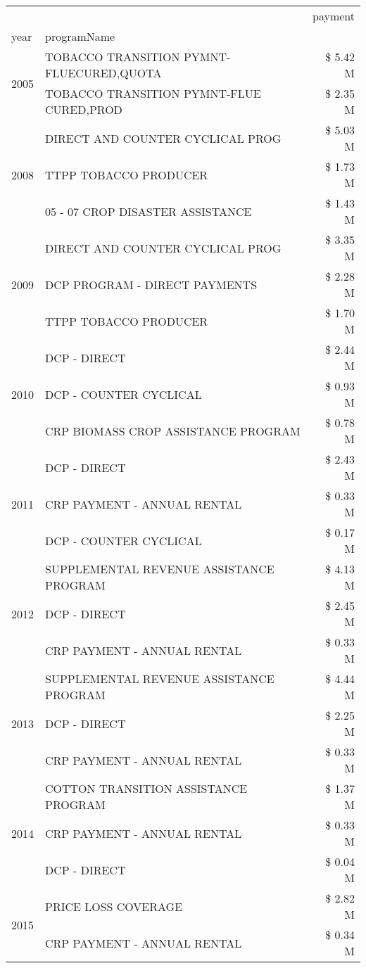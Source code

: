 \begin{tabular}{llr}
\toprule
 &  & payment \\
year & programName &  \\
\midrule
\multirow[t]{2}{*}{2005} & TOBACCO TRANSITION PYMNT-FLUECURED,QUOTA & \$ 5.42 M \\
 & TOBACCO TRANSITION PYMNT-FLUE CURED,PROD & \$ 2.35 M \\
\cline{1-3}
\multirow[t]{3}{*}{2008} & DIRECT AND COUNTER CYCLICAL PROG & \$ 5.03 M \\
 & TTPP TOBACCO PRODUCER & \$ 1.73 M \\
 & 05 - 07 CROP DISASTER ASSISTANCE & \$ 1.43 M \\
\cline{1-3}
\multirow[t]{3}{*}{2009} & DIRECT AND COUNTER CYCLICAL PROG & \$ 3.35 M \\
 & DCP PROGRAM - DIRECT PAYMENTS & \$ 2.28 M \\
 & TTPP TOBACCO PRODUCER & \$ 1.70 M \\
\cline{1-3}
\multirow[t]{3}{*}{2010} & DCP - DIRECT & \$ 2.44 M \\
 & DCP - COUNTER CYCLICAL & \$ 0.93 M \\
 & CRP BIOMASS CROP ASSISTANCE PROGRAM & \$ 0.78 M \\
\cline{1-3}
\multirow[t]{3}{*}{2011} & DCP - DIRECT & \$ 2.43 M \\
 & CRP PAYMENT - ANNUAL RENTAL & \$ 0.33 M \\
 & DCP - COUNTER CYCLICAL & \$ 0.17 M \\
\cline{1-3}
\multirow[t]{3}{*}{2012} & SUPPLEMENTAL REVENUE ASSISTANCE PROGRAM & \$ 4.13 M \\
 & DCP - DIRECT & \$ 2.45 M \\
 & CRP PAYMENT - ANNUAL RENTAL & \$ 0.33 M \\
\cline{1-3}
\multirow[t]{3}{*}{2013} & SUPPLEMENTAL REVENUE ASSISTANCE PROGRAM & \$ 4.44 M \\
 & DCP - DIRECT & \$ 2.25 M \\
 & CRP PAYMENT - ANNUAL RENTAL & \$ 0.33 M \\
\cline{1-3}
\multirow[t]{3}{*}{2014} & COTTON TRANSITION ASSISTANCE PROGRAM & \$ 1.37 M \\
 & CRP PAYMENT - ANNUAL RENTAL & \$ 0.33 M \\
 & DCP - DIRECT & \$ 0.04 M \\
\cline{1-3}
\multirow[t]{3}{*}{2015} & PRICE LOSS COVERAGE & \$ 2.82 M \\
 & CRP PAYMENT - ANNUAL RENTAL & \$ 0.34 M \\

\end{tabular}
